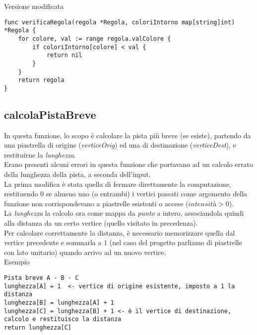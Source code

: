 \documentclass{article}
\begin{document}
Versione modificata
\begin{verbatim}
func verificaRegola(regola *Regola, coloriIntorno map[string]int) *Regola {
	for colore, val := range regola.valColore {
		if coloriIntorno[colore] < val {
			return nil
		}
	}
	return regola
}
\end{verbatim}


\subsection{calcolaPistaBreve}
In questa funzione, lo scopo è calcolare la pista più breve (se esiste), partendo da una piastrella di origine (\textit{verticeOrig}) ed una di destinazione (\textit{verticeDest}), e restituirne la \textit{lunghezza}.
\\
Erano presenti alcuni errori in questa funzione che portavano ad un calcolo errato della lunghezza della pista, a seconda dell'input.\\
La prima modifica è stata quella di fermare direttamente la computazione, restituendo \(0\) se almeno uno (o entrambi) i vertici passati come argomento della funzione non corrispondevano a piastrelle esistenti o accese (\(\textit{intensità} > 0\)).
\\
La \textit{lunghezza} la calcolo ora come mappa da \textit{punto} a intero, associandola quindi alla distanza da un certo vertice (quello visitato in precedenza).\\
Per calcolare correttamente la distanza, è necessario memorizzare quella dal vertice precedente e sommarla a \(1\) (nel caso del progetto parliamo di piastrelle con lato unitario) quando arrivo ad un nuovo vertice.
\\
Esempio
\begin{verbatim}
Pista breve A - B - C
lunghezza[A] = 1  <- vertice di origine esistente, imposto a 1 la distanza
lunghezza[B] = lunghezza[A] + 1
lunghezza[C] = lunghezza[B] + 1 <- è il vertice di destinazione, calcolo e restituisco la distanza
return lunghezza[C] 
\end{verbatim}
\end{document}
